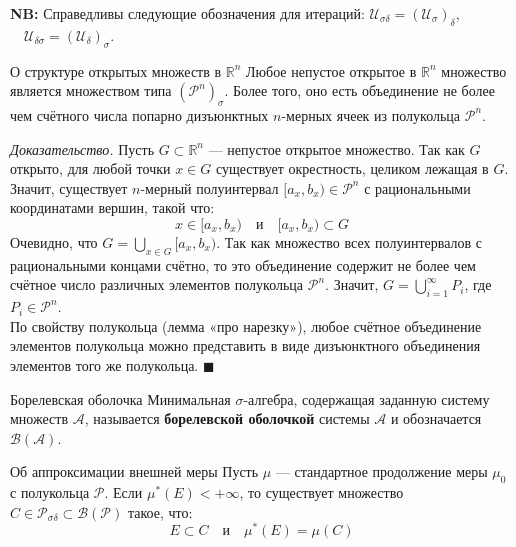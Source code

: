 \documentclass[12pt,a4paper]{article}
\newenvironment{Proof}[1][Доказательство]{\vspace{0.5em}\noindent\textit{#1.}\hspace{0.5em}\ignorespaces}{\hfill$\blacksquare$\vspace{1em}}
\begin{document}
\noindent \textbf{NB:} Справедливы следующие обозначения для итераций: $\mathcal{U}_{\sigma\delta} = (\mathcal{U}_\sigma)_\delta$, $\quad \mathcal{U}_{\delta\sigma} = (\mathcal{U}_\delta)_\sigma$.

\begin{Lemma}{О структуре открытых множеств в $\mathbb{R}^n$}{}
Любое непустое открытое в $\mathbb{R}^n$ множество является множеством типа $(\mathcal{P}^n)_\sigma$. Более того, оно есть объединение не более чем счётного числа попарно дизъюнктных $n$-мерных ячеек из полукольца $\mathcal{P}^n$.
\end{Lemma}

\begin{Proof}
Пусть $G \subset \mathbb{R}^n$ — непустое открытое множество.
Так как $G$ открыто, для любой точки $x \in G$ существует окрестность, целиком лежащая в $G$. Значит, существует $n$-мерный полуинтервал $[a_x, b_x) \in \mathcal{P}^n$ с рациональными координатами вершин, такой что:
$$ x \in [a_x, b_x) \quad \text{и} \quad [a_x, b_x) \subset G $$
Очевидно, что $G = \bigcup\limits_{x \in G} [a_x, b_x)$. 
Так как множество всех полуинтервалов с рациональными концами счётно, то это объединение содержит не более чем счётное число различных элементов полукольца $\mathcal{P}^n$. Значит, $G = \bigcup\limits_{i=1}^{\infty} P_i$, где $P_i \in \mathcal{P}^n$. \\
По свойству полукольца (лемма «про нарезку»), любое счётное объединение элементов полукольца можно представить в виде дизъюнктного объединения элементов того же полукольца.
\end{Proof}

\begin{Definition}{Борелевская оболочка}{}
Минимальная $\sigma$-алгебра, содержащая заданную систему множеств $\mathcal{A}$, называется \textbf{борелевской оболочкой} системы $\mathcal{A}$ и обозначается $\mathcal{B}(\mathcal{A})$.
\end{Definition}

\begin{Theorem}{Об аппроксимации внешней меры}{}
Пусть $\mu$ — стандартное продолжение меры $\mu_0$ с полукольца $\mathcal{P}$. Если $\mu^*(E) < +\infty$, то существует множество $C \in \mathcal{P}_{\sigma\delta} \subset \mathcal{B}(\mathcal{P})$ такое, что:
$$ E \subset C \quad \text{и} \quad \mu^*(E) = \mu(C) $$
\end{Theorem}
\end{document}
